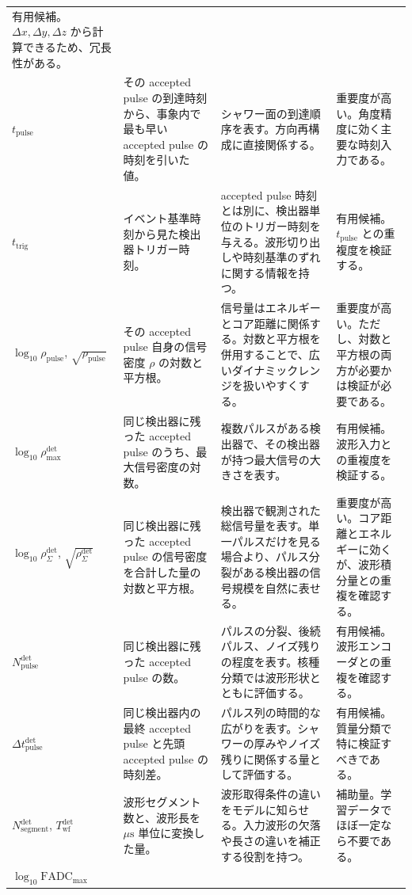 \documentclass[lualatex,paper=a4,fontsize=9pt]{jlreq}
\begin{document}
{\begin{longtable}{p{25mm}p{48mm}p{50mm}p{35mm}}
  有用候補。$\Delta x,\Delta y,\Delta z$ から計算できるため、冗長性がある。 \\
  $t_{\mathrm{pulse}}$ &
  その accepted pulse の到達時刻から、事象内で最も早い accepted pulse の時刻を引いた値。 &
  シャワー面の到達順序を表す。方向再構成に直接関係する。 &
  重要度が高い。角度精度に効く主要な時刻入力である。 \\
  $t_{\mathrm{trig}}$ &
  イベント基準時刻から見た検出器トリガー時刻。 &
  accepted pulse 時刻とは別に、検出器単位のトリガー時刻を与える。波形切り出しや時刻基準のずれに関する情報を持つ。 &
  有用候補。$t_{\mathrm{pulse}}$ との重複度を検証する。 \\
  $\log_{10}\rho_{\mathrm{pulse}}$,
  $\sqrt{\rho_{\mathrm{pulse}}}$ &
  その accepted pulse 自身の信号密度 $\rho$ の対数と平方根。 &
  信号量はエネルギーとコア距離に関係する。対数と平方根を併用することで、広いダイナミックレンジを扱いやすくする。 &
  重要度が高い。ただし、対数と平方根の両方が必要かは検証が必要である。 \\
  $\log_{10}\rho_{\max}^{\mathrm{det}}$ &
  同じ検出器に残った accepted pulse のうち、最大信号密度の対数。 &
  複数パルスがある検出器で、その検出器が持つ最大信号の大きさを表す。 &
  有用候補。波形入力との重複度を検証する。 \\
  $\log_{10}\rho_{\Sigma}^{\mathrm{det}}$,
  $\sqrt{\rho_{\Sigma}^{\mathrm{det}}}$ &
  同じ検出器に残った accepted pulse の信号密度を合計した量の対数と平方根。 &
  検出器で観測された総信号量を表す。単一パルスだけを見る場合より、パルス分裂がある検出器の信号規模を自然に表せる。 &
  重要度が高い。コア距離とエネルギーに効くが、波形積分量との重複を確認する。 \\
  $N_{\mathrm{pulse}}^{\mathrm{det}}$ &
  同じ検出器に残った accepted pulse の数。 &
  パルスの分裂、後続パルス、ノイズ残りの程度を表す。核種分類では波形形状とともに評価する。 &
  有用候補。波形エンコーダとの重複を確認する。 \\
  $\Delta t_{\mathrm{pulse}}^{\mathrm{det}}$ &
  同じ検出器内の最終 accepted pulse と先頭 accepted pulse の時刻差。 &
  パルス列の時間的な広がりを表す。シャワーの厚みやノイズ残りに関係する量として評価する。 &
  有用候補。質量分類で特に検証すべきである。 \\
  $N_{\mathrm{segment}}^{\mathrm{det}}$,
  $T_{\mathrm{wf}}^{\mathrm{det}}$ &
  波形セグメント数と、波形長を $\mu\mathrm{s}$ 単位に変換した量。 &
  波形取得条件の違いをモデルに知らせる。入力波形の欠落や長さの違いを補正する役割を持つ。 &
  補助量。学習データでほぼ一定なら不要である。 \\
  $\log_{10}\mathrm{FADC}_{\max}$ &

\end{longtable}}
\end{document}
